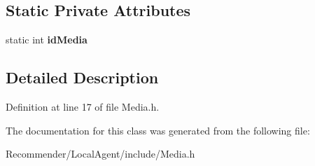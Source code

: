 \subsection*{Static Private Attributes}
\begin{CompactItemize}
\item 
static int {\bf idMedia}\label{classbr_1_1ufscar_1_1lince_1_1ginga_1_1recommender_1_1Media_3e13beaa4d2492c8a0e30b6c1338b13a}

\end{CompactItemize}


\subsection{Detailed Description}




Definition at line 17 of file Media.h.

The documentation for this class was generated from the following file:\begin{CompactItemize}
\item 
Recommender/LocalAgent/include/Media.h\end{CompactItemize}
